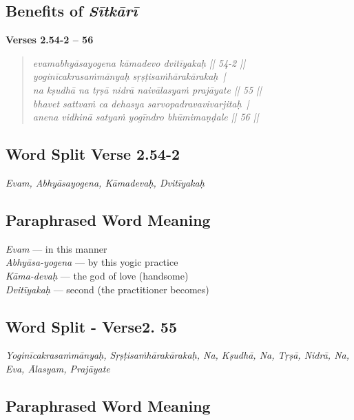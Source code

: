 \subsection*{Benefits of \textit{Sītkārī}}


\noindent \textbf{Verses 2.54-2 -- 56}

\begin{verse}
\textit{evamabhyāsayogena kāmadevo dvitīyakaḥ || 54-2 ||\\
yoginīcakrasaṁmānyaḥ sṛṣṭisaṁhārakārakaḥ |\\
na kṣudhā na tṛṣā nidrā naivālasyaṁ prajāyate || 55 ||\\
bhavet sattvaṁ ca dehasya sarvopadravavivarjitaḥ |\\
anena vidhinā satyaṁ yogīndro bhūmimaṇḍale || 56 ||}
\end{verse}

\subsection*{Word Split Verse 2.54-2}


\textit{Evam, Abhyāsayogena, Kāmadevaḥ, Dvitīyakaḥ}

\subsection*{Paraphrased Word Meaning}

\begin{multicols}{2}
\textit{Evam }--- in this manner\\
\textit{Abhyāsa-yogena} --- by this yogic practice \\
\textit{Kāma-devaḥ} --- the god of love (handsome)\\
\textit{Dvitīyakaḥ }--- second (the practitioner becomes)
\end{multicols}

\subsection*{Word Split - Verse2. 55}


\textit{Yoginīcakrasaṁmānyaḥ, Sṛṣṭisaṁhārakārakaḥ, Na, Kṣudhā, Na, Tṛṣā, Nidrā, Na, Eva, Ālasyam, Prajāyate}

\subsection*{Paraphrased Word Meaning}


